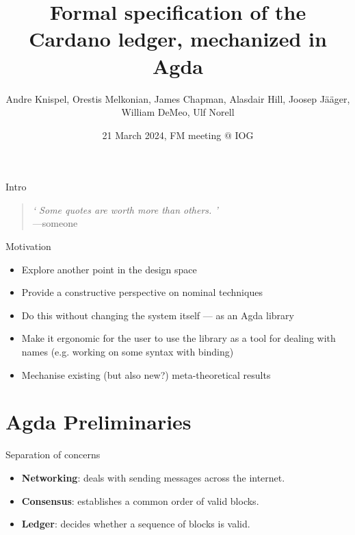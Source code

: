 \documentclass[aspectratio=169]{beamer}
\title{%
Formal specification of the Cardano ledger,
mechanized in Agda}
\author{Andre Knispel, \alert{Orestis Melkonian}, James Chapman,
Alasdair Hill, Joosep Jääger, William DeMeo, Ulf Norell}
\date{21 March 2024, FM meeting $@$ IOG}
\newcommand\myblockquote[2]{%
  \blockquote{\hspace*{2em}\emph{`#1'}#2}\par}
\renewcommand\alert[1]{\textcolor{mLightBrown}{#1}}
\begin{document}
\AgdaNoSpaceAroundCode{}



\begin{center}
\maketitle
\end{center}



\begin{frame}{Intro}
\myblockquote{\textit{
Some quotes are worth more than others.
}}{\\---someone}
\end{frame}

\begin{frame}{Motivation}
\begin{itemize}
\item Explore another \alert{point in the design space}
\item Provide a \alert{constructive} perspective on nominal techniques
\item Do this \alert{without changing the system itself} --- as an Agda library
\item Make it \alert{ergonomic} for the user to use the library as a tool for dealing with names
(e.g. working on some syntax with binding)
\item Mechanise existing (but also new?) \alert{meta-theoretical results}
\end{itemize}
\end{frame}

\section{Agda Preliminaries}

\begin{frame}{Separation of concerns}
\begin{itemize}
\item \textbf{Networking}: deals with sending messages across the internet.
\item \textbf{Consensus}: establishes a common order of valid blocks.
\item \textbf{Ledger}: decides whether a sequence of blocks is valid.
\end{itemize}
\end{frame}
\end{document}
